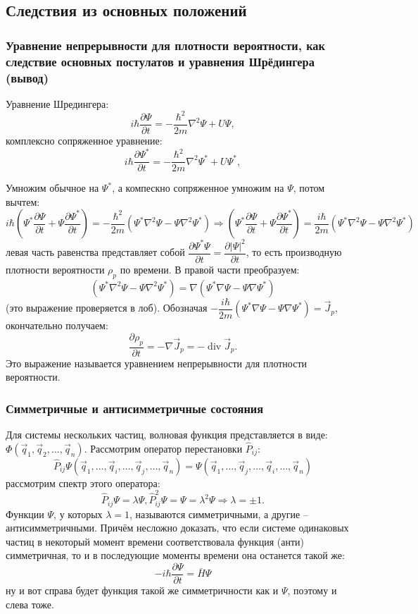 \subsection{Следствия из основных положений}

\subsubsection{Уравнение непрерывности для плотности вероятности, как следствие основных
постулатов и уравнения Шрёдингера (вывод)}

Уравнение Шредингера:
\[
  i \hbar \dfrac{\partial \Psi}{\partial t} = - \dfrac{\hbar^2}{2m} \nabla^2 \Psi + U \Psi,
\]
комплексно сопряженное уравнение:
\[
  i \hbar \dfrac{\partial \Psi^*}{\partial t} = - \dfrac{\hbar^2}{2m} \nabla^2 \Psi^* + U \Psi^*,
\]

Умножим обычное на $\Psi^*$, а компескно сопряженное умножим на $\Psi$, потом вычтем:
\[
  i \hbar \left( \Psi^* \dfrac{\partial \Psi}{\partial t} + \Psi \dfrac{\partial \Psi^*}{\partial t} \right)
  = - \dfrac{\hbar^2}{2m} \left( \Psi^* \nabla^2 \Psi - \Psi \nabla^2 \Psi^* \right) 
  \Rightarrow
  \left( \Psi^* \dfrac{\partial \Psi}{\partial t} + \Psi \dfrac{\partial \Psi^*}{\partial t} \right)
  = \dfrac{i \hbar}{2m} \left( \Psi^* \nabla^2 \Psi - \Psi \nabla^2 \Psi^* \right) 
\]
левая часть равенства представляет собой $\dfrac{\partial \Psi^* \Psi}{\partial t} =
\dfrac{\partial |\Psi|^2}{\partial t}$, то есть производную плотности вероятности $\rho_p$
по времени. В правой части преобразуем:
\[
  \left( \Psi^* \nabla^2 \Psi - \Psi \nabla^2 \Psi^* \right)
  = \nabla \left( \Psi^* \nabla \Psi - \Psi \nabla \Psi^* \right)
\]
(это выражение проверяется в лоб). Обозначая $ - \dfrac{i \hbar}{2m} \left( \Psi^* \nabla \Psi - \Psi \nabla \Psi^* \right) = \vec{J}_p$, окончательно получаем:
\[
  \dfrac{\partial \rho_p}{\partial t} = - \nabla \vec{J}_p =  - \operatorname{div} \vec{J}_p.
\]
Это выражение называется уравнением непрерывности для плотности вероятности.

\subsubsection{Симметричные и антисимметричные состояния}

Для системы нескольких частиц, волновая функция представляется в виде: $\Phi( \vec{q}_1, \vec{q}_2, \dots, \vec{q}_n )$. Рассмотрим оператор перестановки $\hat{P}_{ij}$:
\[
  \hat{P}_{ij} \Psi(\vec{q}_1, \dots, \vec{q}_i, \dots, \vec{q}_j, \dots, \vec{q}_n)
  = \Psi(\vec{q}_1, \dots, \vec{q}_j, \dots, \vec{q}_i, \dots, \vec{q}_n)
\]
рассмотрим спектр этого оператора:
\[
  \hat{P}_{ij} \Psi = \lambda \Psi, \hat{P}^2_{ij} \Psi = \Psi = \lambda^2 \Psi 
  \Rightarrow
  \lambda = \pm 1.
\]
Функции $\Psi$, у которых $\lambda = 1$, называются симметричными, а другие -- антисимметричными. Причём несложно доказать, что если системе одинаковых частиц в некоторый момент времени соответствовала функция (анти) симметричная, то и в последующие моменты времени она останется такой же:
\[
  - i \hbar \dfrac{\partial \Psi}{\partial t} = \bar{H} \Psi
\]
ну и вот справа будет функция такой же симметричности как и $\Psi$, поэтому и слева тоже.

